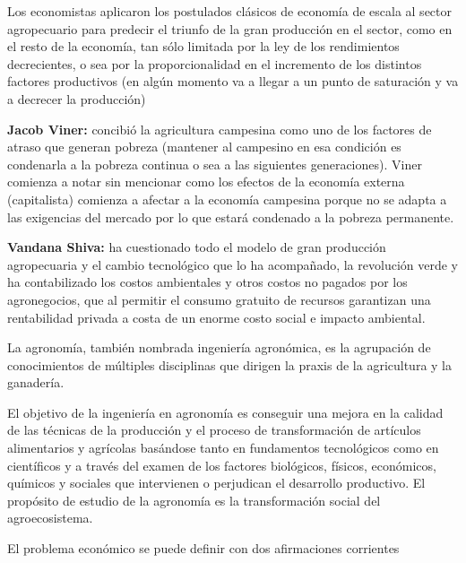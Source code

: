 \documentclass[
  letterpaper,
  DIV=11,
  numbers=noendperiod]{scrartcl}
\begin{document}
Los economistas aplicaron los postulados clásicos de economía de escala
al sector agropecuario para predecir el triunfo de la gran producción en
el sector, como en el resto de la economía, tan sólo limitada por la ley
de los rendimientos decrecientes, o sea por la proporcionalidad en el
incremento de los distintos factores productivos (en algún momento va a
llegar a un punto de saturación y va a decrecer la producción)

\textbf{Jacob Viner:} concibió la agricultura campesina como uno de los
factores de atraso que generan pobreza (mantener al campesino en esa
condición es condenarla a la pobreza continua o sea a las siguientes
generaciones). Viner comienza a notar sin mencionar como los efectos de
la economía externa (capitalista) comienza a afectar a la economía
campesina porque no se adapta a las exigencias del mercado por lo que
estará condenado a la pobreza permanente.

\textbf{Vandana Shiva:} ha cuestionado todo el modelo de gran producción
agropecuaria y el cambio tecnológico que lo ha acompañado, la revolución
verde y ha contabilizado los costos ambientales y otros costos no
pagados por los agronegocios, que al permitir el consumo gratuito de
recursos garantizan una rentabilidad privada a costa de un enorme costo
social e impacto ambiental.

La agronomía, también nombrada ingeniería agronómica, es la agrupación
de conocimientos de múltiples disciplinas que dirigen la praxis de la
agricultura y la ganadería.

El objetivo de la ingeniería en agronomía es conseguir una mejora en la
calidad de las técnicas de la producción y el proceso de transformación
de artículos alimentarios y agrícolas basándose tanto en fundamentos
tecnológicos como en científicos y a través del examen de los factores
biológicos, físicos, económicos, químicos y sociales que intervienen o
perjudican el desarrollo productivo. El propósito de estudio de la
agronomía es la transformación social del agroecosistema.

El problema económico se puede definir con dos afirmaciones corrientes
\end{document}
